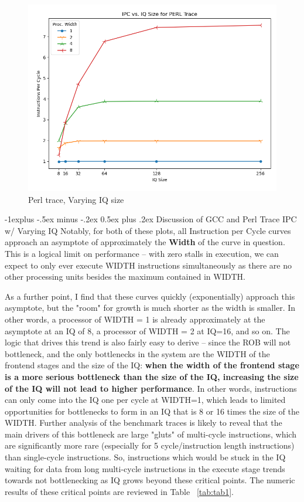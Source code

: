 \documentclass[12pt,portrait]{article}
\makeatletter
\renewcommand{\subsection}{\@startsection{subsection}{2}{0mm}%
                                {-1explus -.5ex minus -.2ex}%
                                {0.5ex plus .2ex}%
                                {\normalfont\normalsize\bfseries}}
\makeatother
\begin{document}
\begin{figure}[h!]
\centering
\includegraphics[width=5in]{iqs_perl.png}
\caption{Perl trace, Varying IQ size}
\label{fig:plot2}
\end{figure}

\subsection{Discussion of GCC and Perl Trace IPC w/ Varying IQ}
Notably, for both of these plots, all Instruction per Cycle curves approach an asymptote of approximately the \textbf{Width} of the curve in question. This is a logical limit on performance -- with zero stalls in execution, we can expect to only ever execute WIDTH instructions simultaneously as there are no other processing units besides the maximum contained in WIDTH. 

As a further point, I find that these curves quickly (exponentially) approach this asymptote, but the "room" for growth is much shorter as the width is smaller. In other words, a processor of WIDTH = 1 is already approximately at the asymptote at an IQ of 8, a processor of WIDTH = 2 at IQ=16, and so on. The logic that drives this trend is also fairly easy to derive -- since the ROB will not bottleneck, and the only bottlenecks in the system are the WIDTH of the frontend stages and the size of the IQ: \textbf{when the width of the frontend stage is a more serious bottleneck than the size of the IQ, increasing the size of the IQ will not lead to higher performance}. In other words, instructions can only come into the IQ one per cycle at WIDTH=1, which leads to limited opportunities for bottlenecks to form in an IQ that is 8 or 16 times the size of the WIDTH. Further analysis of the benchmark traces is likely to reveal that the main drivers of this bottleneck are large "gluts" of multi-cycle instructions, which are significantly more rare (especially for 5 cycle/instruction length instructions) than single-cycle instructions. So, instructions which would be stuck in the IQ waiting for data from long multi-cycle instructions in the execute stage trends towards not bottlenecking as IQ grows beyond these critical points. The numeric results of these critical points are reviewed in Table ~\ref{tab:tab1}.
\end{document}
